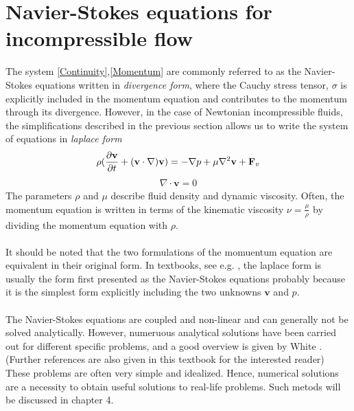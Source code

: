 \section{Navier-Stokes equations for incompressible flow}
The system \eqref{Continuity},\eqref{Momentum} are commonly referred to as the Navier-Stokes equations written in \textit{divergence form}, where the Cauchy stress tensor, $\sigma$ is explicitly included in the momentum equation and contributes to the momentum through its divergence. However, in the case of Newtonian incompressible fluids, the simplifications described in the previous section allows us to write the system of equations in \textit{laplace form}
\begin{align}
\rho(\frac{\partial \mathbf{v}}{\partial t} + (\mathbf{v} \cdot \nabla) \mathbf{v}) = -\nabla p + \mu\nabla^2 \mathbf{v} + \mathbf{F}_v \label{Navier}
\end{align}
\begin{align}
\nabla \cdot \mathbf{v} = 0 \label{Stokes}
\end{align}
The parameters $\rho$ and $\mu$ describe fluid density and dynamic viscosity. Often, the momentum equation is written in terms of the kinematic viscosity $\nu = \frac{\mu}{\rho}$ by dividing the momentum equation with $\rho$. \\
\\
It should be noted that the two formulations of the momuentum equation are equivalent in their original form. In textbooks, see e.g. \cite{Newm77,Whit06,Kund2012}, the laplace form is usually the form first presented as the Navier-Stokes equations probably because it is the simplest form explicitly including the two unknowns $\mathbf{v}$ and $p$. \\
\\
The Navier-Stokes equations are coupled and non-linear and can generally not be solved analytically. However, numeruous analytical solutions have been carried out for different specific problems, and a good overview is given by White \cite[pp. 97-164]{Whit06}. (Further references are also given in this textbook for the interested reader) These problems are often very simple and idealized. Hence, numerical solutions are a necessity to obtain useful solutions to real-life problems. Such metods will be discussed in chapter 4. 
